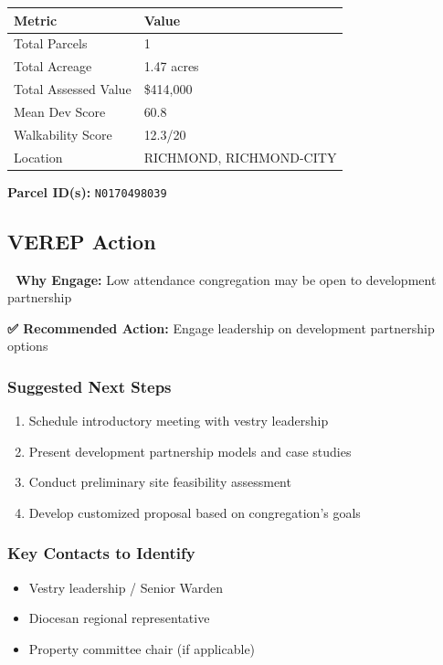 \documentclass[
  letterpaper,
  DIV=11,
  numbers=noendperiod,
  oneside]{scrreprt}
\providecommand{\tightlist}{%
  \setlength{\itemsep}{0pt}\setlength{\parskip}{0pt}}
\begin{document}
\begin{longtable}[]{@{}ll@{}}
\toprule\noalign{}
Metric & Value \\
\midrule\noalign{}
\endhead
\bottomrule\noalign{}
\endlastfoot
Total Parcels & 1 \\
Total Acreage & 1.47 acres \\
Total Assessed Value & \$414,000 \\
Mean Dev Score & 60.8 \\
Walkability Score & 12.3/20 \\
Location & RICHMOND, RICHMOND-CITY \\
\end{longtable}

\textbf{Parcel ID(s):} \texttt{N0170498039}

\subsection{VEREP Action}

\textbf{🎯 Why Engage:} Low attendance congregation may be open to
development partnership

\textbf{✅ Recommended Action:} Engage leadership on development
partnership options

\subsubsection{Suggested Next Steps}\label{suggested-next-steps-3}

\begin{enumerate}
\def\labelenumi{\arabic{enumi}.}
\tightlist
\item
  Schedule introductory meeting with vestry leadership
\item
  Present development partnership models and case studies
\item
  Conduct preliminary site feasibility assessment
\item
  Develop customized proposal based on congregation's goals
\end{enumerate}

\subsubsection{Key Contacts to
Identify}\label{key-contacts-to-identify-3}

\begin{itemize}
\tightlist
\item[$\square$]
  Vestry leadership / Senior Warden
\item[$\square$]
  Diocesan regional representative
\item[$\square$]
  Property committee chair (if applicable)
\end{itemize}
\end{document}
